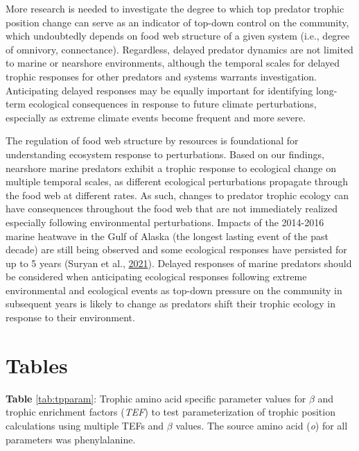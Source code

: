 \documentclass [11pt, proquest] {uwthesis}[2015/03/03]
\begin{document}
More research is needed to investigate the degree to which top predator
trophic position change can serve as an indicator of top-down control on
the community, which undoubtedly depends on food web structure of a
given system (i.e., degree of omnivory, connectance). Regardless,
delayed predator dynamics are not limited to marine or nearshore
environments, although the temporal scales for delayed trophic responses
for other predators and systems warrants investigation. Anticipating
delayed responses may be equally important for identifying long-term
ecological consequences in response to future climate perturbations,
especially as extreme climate events become frequent and more severe.

The regulation of food web structure by resources is foundational for
understanding ecosystem response to perturbations. Based on our
findings, nearshore marine predators exhibit a trophic response to
ecological change on multiple temporal scales, as different ecological
perturbations propagate through the food web at different rates. As
such, changes to predator trophic ecology can have consequences
throughout the food web that are not immediately realized especially
following environmental perturbations. Impacts of the 2014-2016 marine
heatwave in the Gulf of Alaska (the longest lasting event of the past
decade) are still being observed and some ecological responses have
persisted for up to 5 years (Suryan et al.,
\protect\hyperlink{ref-Suryan2021}{2021}). Delayed responses of marine
predators should be considered when anticipating ecological responses
following extreme environmental and ecological events as top-down
pressure on the community in subsequent years is likely to change as
predators shift their trophic ecology in response to their environment.
\clearpage

\section{Tables}\label{tables-2}

\textbf{Table} \ref{tab:tpparam}: Trophic amino acid specific parameter
values for \(\beta\) and trophic enrichment factors (\emph{TEF}) to test
parameterization of trophic position calculations using multiple TEFs
and \(\beta\) values. The source amino acid (\emph{o}) for all
parameters was phenylalanine.
\end{document}
